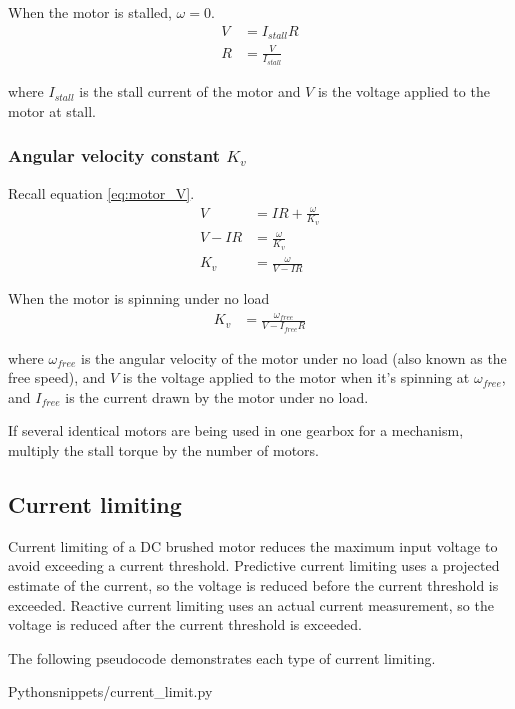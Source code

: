 When the motor is stalled, $\omega = 0$.
\begin{align}
  V &= I_{stall} R \nonumber \\
  R &= \frac{V}{I_{stall}}
\end{align}

where $I_{stall}$ is the stall current of the motor and $V$ is the voltage
applied to the motor at stall.

\subsubsection{Angular velocity constant $K_v$}

Recall equation \eqref{eq:motor_V}.
\begin{align*}
  V &= IR + \frac{\omega}{K_v} \\
  V - IR &= \frac{\omega}{K_v} \\
  K_v &= \frac{\omega}{V - IR}
\end{align*}

When the motor is spinning under no load
\begin{align}
  K_v &= \frac{\omega_{free}}{V - I_{free}R}
\end{align}

where $\omega_{free}$ is the angular velocity of the motor under no load (also
known as the free speed), and $V$ is the voltage applied to the motor when it's
spinning at $\omega_{free}$, and $I_{free}$ is the current drawn by the motor
under no load.

If several identical motors are being used in one gearbox for a mechanism,
multiply the stall torque by the number of motors.

\subsection{Current limiting}

Current limiting of a DC brushed motor reduces the maximum input voltage to
avoid exceeding a current threshold. Predictive current limiting uses a
projected estimate of the current, so the voltage is reduced before the current
threshold is exceeded. Reactive current limiting uses an actual current
measurement, so the voltage is reduced after the current threshold is exceeded.

The following pseudocode demonstrates each type of current limiting.
\begin{code}{Python}{snippets/current_limit.py}
  \caption{Limits current of DC motor to $I_{max}$}
\end{code}
